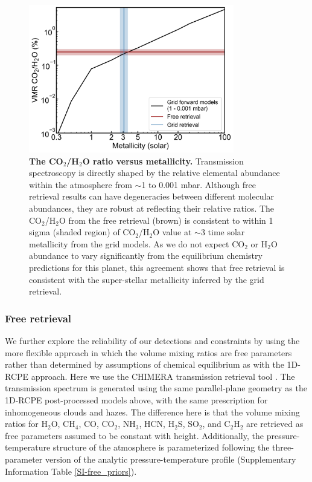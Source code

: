 \documentclass[sn-standardnature]{sn-jnl}%
\begin{document}
\begin{figure}
\centering
\includegraphics[width=0.8\textwidth,keepaspectratio]{figs/ED_Fig7.png}
  \caption{\textbf{The CO$_2$/H$_2$O ratio versus metallicity.} Transmission spectroscopy is directly shaped by the relative elemental abundance within the atmosphere from $\sim$1 to 0.001 mbar. Although free retrieval results can have degeneracies between different molecular abundances, they are robust at reflecting their relative ratios. The CO$_2$/H$_2$O from the free retrieval (brown) is consistent to within 1 sigma (shaded region) of CO$_2$/H$_2$O value at $\sim$3 time solar metallicity from the grid models. As we do not expect CO$_2$ or H$_2$O abundance to vary significantly from the equilibrium chemistry predictions for this planet, this agreement shows that free retrieval is consistent with the super-stellar metallicity inferred by the grid retrieval.}
  \label{fig:vmr_ratio}
\end{figure}



\subsubsection*{Free retrieval}

We further explore the reliability of our detections and constraints by using the more flexible approach in which the volume mixing ratios are free parameters rather than determined by assumptions of chemical equilibrium as with the 1D-RCPE approach. Here we use the CHIMERA transmission retrieval tool . The transmission spectrum is generated using the same parallel-plane geometry as the 1D-RCPE post-processed models above, with the same prescription for inhomogeneous clouds and hazes. The difference here is that the volume mixing ratios for H$_2$O, CH$_4$, CO, CO$_2$, NH$_3$, HCN, H$_2$S, SO$_2$, and C$_2$H$_2$ are retrieved as free parameters assumed to be constant with height. Additionally, the pressure-temperature structure of the atmosphere is parameterized following the three-parameter version of the analytic  pressure-temperature profile (Supplementary Information Table \ref{SI-free_priors}).
\end{document}
